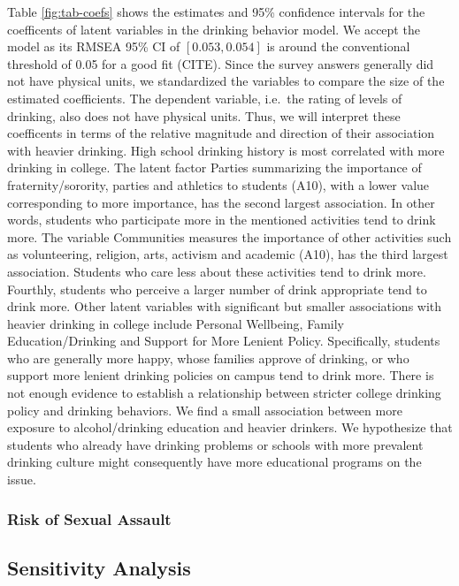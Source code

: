 \documentclass[]{article}
\begin{document}
Table \ref{fig:tab-coefs} shows the estimates and 95\% confidence
intervals for the coefficents of latent variables in the drinking
behavior model. We accept the model as its RMSEA 95\% CI of
\([0.053, 0.054]\) is around the conventional threshold of 0.05 for a
good fit (CITE). Since the survey answers generally did not have
physical units, we standardized the variables to compare the size of the
estimated coefficients. The dependent variable, i.e.~the rating of
levels of drinking, also does not have physical units. Thus, we will
interpret these coefficents in terms of the relative magnitude and
direction of their association with heavier drinking. High school
drinking history is most correlated with more drinking in college. The
latent factor Parties summarizing the importance of fraternity/sorority,
parties and athletics to students (A10), with a lower value
corresponding to more importance, has the second largest association. In
other words, students who participate more in the mentioned activities
tend to drink more. The variable Communities measures the importance of
other activities such as volunteering, religion, arts, activism and
academic (A10), has the third largest association. Students who care
less about these activities tend to drink more. Fourthly, students who
perceive a larger number of drink appropriate tend to drink more. Other
latent variables with significant but smaller associations with heavier
drinking in college include Personal Wellbeing, Family
Education/Drinking and Support for More Lenient Policy. Specifically,
students who are generally more happy, whose families approve of
drinking, or who support more lenient drinking policies on campus tend
to drink more. There is not enough evidence to establish a relationship
between stricter college drinking policy and drinking behaviors. We find
a small association between more exposure to alcohol/drinking education
and heavier drinkers. We hypothesize that students who already have
drinking problems or schools with more prevalent drinking culture might
consequently have more educational programs on the issue.

\hypertarget{risk-of-sexual-assault}{%
\subsubsection{Risk of Sexual Assault}\label{risk-of-sexual-assault}}

\hypertarget{sensitivity-analysis}{%
\subsection{Sensitivity Analysis}\label{sensitivity-analysis}}
\end{document}
